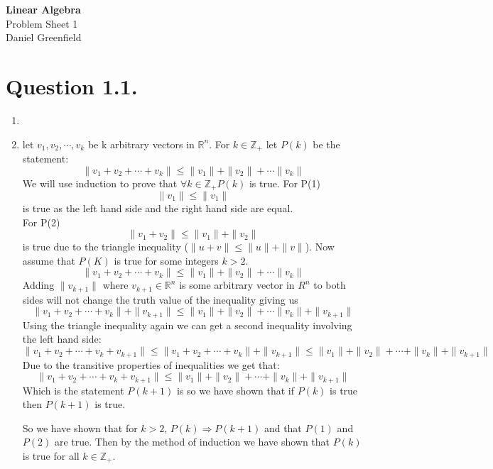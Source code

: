 \documentclass[11pt,a4paper]{article}
\newcommand{\modulename}{Linear Algebra}
\newcommand{\sheetnumber}{1}
\newcommand{\myname}{Daniel Greenfield}
\newcommand{\Z}{\mathbb{Z}}
\newcommand{\R}{\mathbb{R}}
\begin{document}
\begin{center}
  {\Large \textbf{\modulename}}\\[0.3em]
  {\large Problem Sheet \sheetnumber}\\[0.3em]
  \myname
\end{center}
\section*{Question 1.1.}

    \begin{enumerate}[label=\alph*.]
        \item
        \item let $v_1, v_2, \cdots , v_k$ be k arbitrary vectors in $\R^n$. For $k \in \Z_{+}$ let $P(k)$  be the statement:
            \[
                \| v_1 + v_2 + \cdots + v_k \| \leq \| v_1 \| + \| v_2 \| + \cdots \| v_k \|
            \]
        We will use induction to prove that $\forall k \in \Z_+ P(k)$ is true.
        For P(1) \[
            \| v_1 \| \leq \| v_1 \| 
        \] 
        is true as the left hand side and the right hand side are equal. \\
        For P(2) \[
            \| v_1 + v_2 \| \leq \| v_1 \| + \| v_2 \|      
        \] is true due to the triangle inequality ($ \| u + v \| \leq \| u \| + \| v \| $).
        Now assume that $P(K)$ is true for some integers $k > 2$.
        \[
            \| v_1 + v_2 + \cdots + v_k \| \leq \| v_1 \| + \| v_2 \| + \cdots \| v_k \|
        \]
        Adding $\| v_{k+1} \|$ where $v_{k+1} \in \R^n$ is some arbitrary vector in $R^n$ to both sides will not change the truth value of the inequality giving us
        \[
            \| v_1 + v_2 + \cdots + v_k \| + \| v_{k+1} \|  \leq \| v_1 \| + \| v_2 \| + \cdots \| v_k \| + \| v_{k+1} \| 
        \]
        Using the triangle inequality again we can get a second inequality involving the left hand side:
        \[
            \| v_1 + v_2 + \cdots + v_k + v_{k+1}\|\leq \| v_1 + v_2 + \cdots + v_k \| + \| v_{k+1} \|  \leq \| v_1 \| + \| v_2 \| + \cdots + \| v_k \| + \| v_{k+1} \| 
        \]
        Due to the transitive properties of inequalities we get that:
        \[
            \| v_1 + v_2 + \cdots + v_k + v_{k+1}\| \leq \| v_1 \| + \| v_2 \| + \cdots + \| v_k \| + \| v_{k+1} \| 
        \]
        Which is the statement $P(k+1)$ is so we have shown that if $P(k)$ is true then $P(k+1)$ is true.

        So we have shown that for $k > 2$, $P(k) \Rightarrow P(k+1)$ and that $P(1)$ and $P(2)$ are true. Then by the method of induction we have shown that $P(k)$ is true for all $k \in \Z_+$.

    \end{enumerate}
\end{document}
